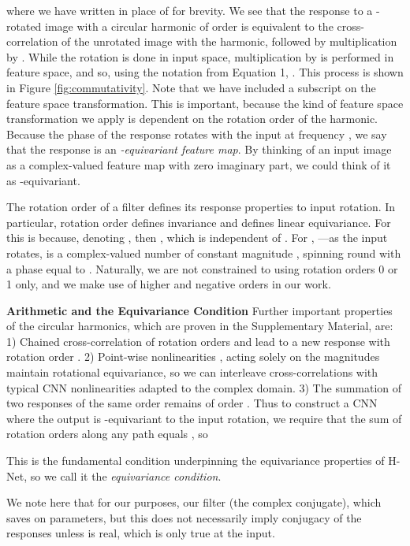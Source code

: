 \documentclass[10pt,twocolumn,letterpaper]{article}
\begin{document}
where we have written  in place of  for brevity. We see that the response to a -rotated image  with a circular harmonic of order  is equivalent to the cross-correlation of the unrotated image  with the harmonic, followed by multiplication by . While the rotation is done in input space,  multiplication by  is performed in feature space, and so, using the notation from Equation 1, . This process is shown in Figure \ref{fig:commutativity}. Note that we have included a subscript  on the feature space transformation. This is important, because the kind of feature space transformation we apply is dependent on the rotation order of the harmonic. Because the phase of the response rotates with the input at frequency , we say that the response is an \emph{-equivariant feature map}. By thinking of an input image as a complex-valued feature map with zero imaginary part, we could think of it as -equivariant. 

The rotation order of a filter defines its response properties to input rotation. In particular, rotation order  defines invariance and  defines linear equivariance. For  this is because, denoting , then , which is independent of . For , ---as the input rotates,  is a complex-valued number of constant magnitude , spinning round with a phase equal to . Naturally, we are not constrained to using rotation orders 0 or 1 only, and we make use of higher and negative orders in our work. 

\textbf{Arithmetic and the Equivariance Condition}
\label{sec:properties}
Further important properties of the circular harmonics, which are proven 
in the Supplementary Material, are: 1) Chained cross-correlation of rotation 
orders  and  lead to a new response with rotation order .
2) Point-wise nonlinearities , acting solely on the 
magnitudes maintain rotational equivariance, so we can interleave 
cross-correlations with typical CNN nonlinearities adapted to the complex 
domain. 3) The summation of two responses of the same order  remains of 
order . Thus to construct a CNN where the output is -equivariant 
to the input rotation, we require that the sum of rotation orders along 
any path equals , so

This is the fundamental condition underpinning the equivariance properties
of H-Net, so we call it the \emph{equivariance condition}.

We note here that for our purposes, our filter  (the 
complex conjugate), which saves on parameters, but this does not necessarily 
imply conjugacy of the responses unless  is real, which is only true 
at the input.
\end{document}
